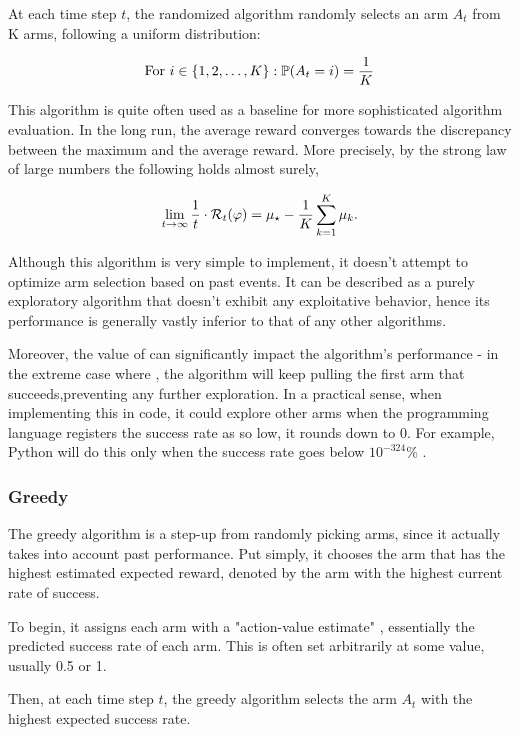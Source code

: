 At each time step $t$, the randomized algorithm randomly selects an arm $A_t$ from K arms, following a uniform distribution:

$$\text{For } i \in \{1, 2, \ldots, K\}: \mathbb{P}(A_t = i) = \frac{1}{K}$$

This algorithm is quite often used as a baseline for more sophisticated algorithm evaluation. In the long run, the average reward converges towards the discrepancy between the maximum and the average reward. More precisely, by the strong law of large numbers the following holds almost surely,

$$\lim_{{t \to \infty}} \frac{1}{t}\cdot \mathcal{R}_{t}(\varphi) = \mu_{\star}-\frac{1}{K} \sum_{{k=1}}^{K} \mu_{k}.$$

Although this algorithm is very simple to implement, it doesn't attempt to optimize arm selection based on past events. It can be described as a purely exploratory algorithm that doesn't exhibit any exploitative behavior, hence its performance is generally vastly inferior to that of any other algorithms.

Moreover, the value of \actionValueEstimate \space can significantly impact the algorithm's performance - in the extreme case where , the algorithm will keep pulling the first arm that succeeds,preventing any further exploration.
In a practical sense, when implementing this in code, it could explore other arms when the programming language registers the success rate as so low, it rounds down to 0.
For example, Python will do this only when the success rate goes below $10^{-324}\%$ \cite{python_min_float}.

\subsubsection{Greedy}
\label{sec:Greedy}
The greedy algorithm is a step-up from randomly picking arms, since it actually takes into account past performance. Put simply, it chooses the arm that has the highest estimated expected reward, denoted by the arm with the highest current rate of success.

To begin, it assigns each arm with a "action-value estimate" \actionValueEstimate, essentially the predicted success rate of each arm. This is often set arbitrarily at some value, usually 0.5 or 1.

Then, at each time step $t$, the greedy algorithm selects the arm $A_t$ with the highest expected success rate.

